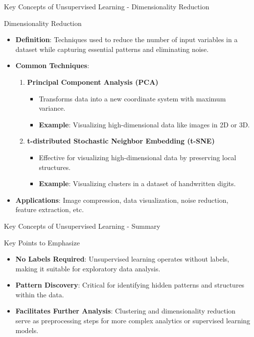 \documentclass[aspectratio=169]{beamer}
\begin{document}
\begin{frame}[fragile]{Key Concepts of Unsupervised Learning - Dimensionality Reduction}
    \begin{block}{Dimensionality Reduction}
        \begin{itemize}
            \item \textbf{Definition}: Techniques used to reduce the number of input variables in a dataset while capturing essential patterns and eliminating noise.
            \item \textbf{Common Techniques}:
                \begin{enumerate}
                    \item \textbf{Principal Component Analysis (PCA)}
                        \begin{itemize}
                            \item Transforms data into a new coordinate system with maximum variance.
                            \item \textbf{Example}: Visualizing high-dimensional data like images in 2D or 3D.
                        \end{itemize}
                    \item \textbf{t-distributed Stochastic Neighbor Embedding (t-SNE)}
                        \begin{itemize}
                            \item Effective for visualizing high-dimensional data by preserving local structures.
                            \item \textbf{Example}: Visualizing clusters in a dataset of handwritten digits.
                        \end{itemize}
                \end{enumerate}
            \item \textbf{Applications}: Image compression, data visualization, noise reduction, feature extraction, etc.
        \end{itemize}
    \end{block}
\end{frame}

\begin{frame}[fragile]{Key Concepts of Unsupervised Learning - Summary}
    \begin{block}{Key Points to Emphasize}
        \begin{itemize}
            \item \textbf{No Labels Required}: Unsupervised learning operates without labels, making it suitable for exploratory data analysis.
            \item \textbf{Pattern Discovery}: Critical for identifying hidden patterns and structures within the data.
            \item \textbf{Facilitates Further Analysis}: Clustering and dimensionality reduction serve as preprocessing steps for more complex analytics or supervised learning models.
        \end{itemize}
    \end{block}
\end{frame}
\end{document}
